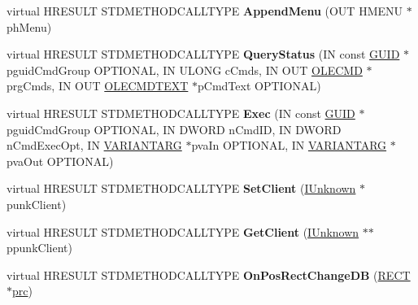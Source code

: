 \begin{DoxyCompactItemize}
\item 
\mbox{\label{class_c_start_menu_site_abbd302d39cb1ca728815dbb04c47aa1f}} 
virtual H\+R\+E\+S\+U\+LT S\+T\+D\+M\+E\+T\+H\+O\+D\+C\+A\+L\+L\+T\+Y\+PE {\bfseries Append\+Menu} (O\+UT H\+M\+E\+NU $\ast$ph\+Menu)
\item 
\mbox{\label{class_c_start_menu_site_ac03a4c3854185deeb1ace8f8e68c76a7}} 
virtual H\+R\+E\+S\+U\+LT S\+T\+D\+M\+E\+T\+H\+O\+D\+C\+A\+L\+L\+T\+Y\+PE {\bfseries Query\+Status} (IN const \hyperlink{interface_g_u_i_d}{G\+U\+ID} $\ast$pguid\+Cmd\+Group O\+P\+T\+I\+O\+N\+AL, IN U\+L\+O\+NG c\+Cmds, IN O\+UT \hyperlink{struct_i_ole_command_target_1_1__tag_o_l_e_c_m_d}{O\+L\+E\+C\+MD} $\ast$prg\+Cmds, IN O\+UT \hyperlink{struct_i_ole_command_target_1_1__tag_o_l_e_c_m_d_t_e_x_t}{O\+L\+E\+C\+M\+D\+T\+E\+XT} $\ast$p\+Cmd\+Text O\+P\+T\+I\+O\+N\+AL)
\item 
\mbox{\label{class_c_start_menu_site_ac8c0a250659ab8957d8a2a6103fee019}} 
virtual H\+R\+E\+S\+U\+LT S\+T\+D\+M\+E\+T\+H\+O\+D\+C\+A\+L\+L\+T\+Y\+PE {\bfseries Exec} (IN const \hyperlink{interface_g_u_i_d}{G\+U\+ID} $\ast$pguid\+Cmd\+Group O\+P\+T\+I\+O\+N\+AL, IN D\+W\+O\+RD n\+Cmd\+ID, IN D\+W\+O\+RD n\+Cmd\+Exec\+Opt, IN \hyperlink{structtag_v_a_r_i_a_n_t}{V\+A\+R\+I\+A\+N\+T\+A\+RG} $\ast$pva\+In O\+P\+T\+I\+O\+N\+AL, IN \hyperlink{structtag_v_a_r_i_a_n_t}{V\+A\+R\+I\+A\+N\+T\+A\+RG} $\ast$pva\+Out O\+P\+T\+I\+O\+N\+AL)
\item 
\mbox{\label{class_c_start_menu_site_ace1f20977454319c9409582051faf0d8}} 
virtual H\+R\+E\+S\+U\+LT S\+T\+D\+M\+E\+T\+H\+O\+D\+C\+A\+L\+L\+T\+Y\+PE {\bfseries Set\+Client} (\hyperlink{interface_i_unknown}{I\+Unknown} $\ast$punk\+Client)
\item 
\mbox{\label{class_c_start_menu_site_ad2dccdf78ab53c9e77a22d481117ea9d}} 
virtual H\+R\+E\+S\+U\+LT S\+T\+D\+M\+E\+T\+H\+O\+D\+C\+A\+L\+L\+T\+Y\+PE {\bfseries Get\+Client} (\hyperlink{interface_i_unknown}{I\+Unknown} $\ast$$\ast$ppunk\+Client)
\item 
\mbox{\label{class_c_start_menu_site_af3affefaafdc96f663497cf4d819f028}} 
virtual H\+R\+E\+S\+U\+LT S\+T\+D\+M\+E\+T\+H\+O\+D\+C\+A\+L\+L\+T\+Y\+PE {\bfseries On\+Pos\+Rect\+Change\+DB} (\hyperlink{structtag_r_e_c_t}{R\+E\+CT} $\ast$\hyperlink{structtag_r_e_c_t}{prc})
$$
\end{DoxyCompactItemize}
